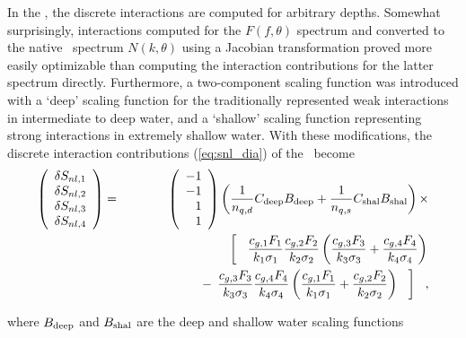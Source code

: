 In the \gmd, the discrete interactions are computed for arbitrary depths.
Somewhat surprisingly, interactions computed for the $F(f, \theta)$ spectrum
and converted to the native \ws\ spectrum $N(k, \theta)$ using a Jacobian
transformation proved more easily optimizable than computing the interaction
contributions for the latter spectrum directly. Furthermore, a two-component
scaling function was introduced with a `deep' scaling function for the
traditionally represented weak interactions in intermediate to deep water, and
a `shallow' scaling function representing strong interactions in extremely
shallow water. With these modifications, the discrete interaction
contributions (\ref{eq:snl_dia}) of the \dia\ become
\begin{eqnarray}
\left ( \begin{array}{c}
  \delta S_{nl,1} \\ \delta S_{nl,2} \\ \delta S_{nl,3} \\ \delta S_{nl,4} 
\end{array} \right )  & = &  
\left ( \begin{array}{r} -1 \\  -1 \\ 1 \\ 1 \end{array} \right )
  \left ( \frac{1}{n_{q,d}} C_{\rm{deep}} B_{\rm{deep}} + 
          \frac{1}{n_{q,s}} C_{\rm{shal}} B_{\rm{shal}} \right ) \times \nonumber \\
 &  & \hspace{20mm} \left [ \:\:\:\:
                    \frac{c_{g,1}F_1}{k_1 \sigma_1} 
                    \frac{c_{g,2}F_2}{k_2 \sigma_2} \left ( 
                    \frac{c_{g,3}F_3}{k_3 \sigma_3} +
                    \frac{c_{g,4}F_4}{k_4 \sigma_4} \right )
                                                         \right . \nonumber \\
 &  &  \hspace{20mm} \left . - \:\:
                    \frac{c_{g,3}F_3}{k_3 \sigma_3} 
                    \frac{c_{g,4}F_4}{k_4 \sigma_4} \left ( 
                    \frac{c_{g,1}F_1}{k_1 \sigma_1} + 
                    \frac{c_{g,2}F_2}{k_2 \sigma_2} \right ) \:\:\:\:
                                                    \right ] \:\:\:
, \label{eq:gmd_dsnl} 
\end{eqnarray}

\noindent
where $B_{\rm{deep}}$ and $B_{\rm{shal}}$ are the deep and shallow water
scaling functions

